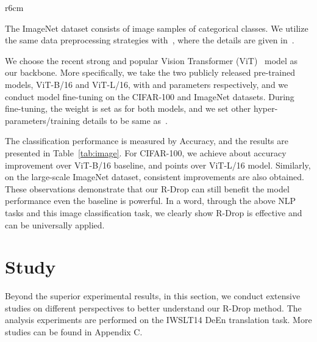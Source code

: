 \documentclass{article}
\begin{document}
\begin{wraptable}{r}{6cm}
\vspace{-0.3cm}
\centering
{}
\caption{
Accuracy on CIFAR-100 and ImageNet classification tasks.
}
\label{tab:image}
\vspace{-0.5cm}
\end{wraptable}


The ImageNet dataset consists of  image samples of  categorical classes. 
We utilize the same data preprocessing strategies with~\cite{dosovitskiy2021an}, where the details are given in~\cite{kolesnikov2019big}.



We choose the recent strong and popular Vision Transformer (ViT)~\cite{dosovitskiy2021an} model as our backbone. 
More specifically, we take the two publicly released pre-trained models, ViT-B/16 and ViT-L/16, with  and  parameters respectively, and we conduct model fine-tuning on the CIFAR-100 and ImageNet datasets. 
During fine-tuning, the weight  is set as  for both models, and we set other hyper-parameters/training details to be same as~\cite{dosovitskiy2021an}.



The classification performance is measured by Accuracy, and the results are presented in Table~\ref{tab:image}. 
For CIFAR-100, we achieve about  accuracy improvement over ViT-B/16 baseline, and  points over ViT-L/16 model. 
Similarly, on the large-scale ImageNet dataset, consistent improvements are also obtained. 
These observations demonstrate that our R-Drop can still benefit the model performance even the baseline is powerful. 
In a word, through the above NLP tasks and this image classification task, we clearly show R-Drop is effective and can be universally applied. 



\section{Study}
\label{sec:study}
Beyond the superior experimental results, in this section, we conduct extensive studies on different perspectives to better understand our R-Drop method. 
The analysis experiments are performed on the IWSLT14 DeEn translation task. More studies can be found in Appendix C. 
\end{document}
